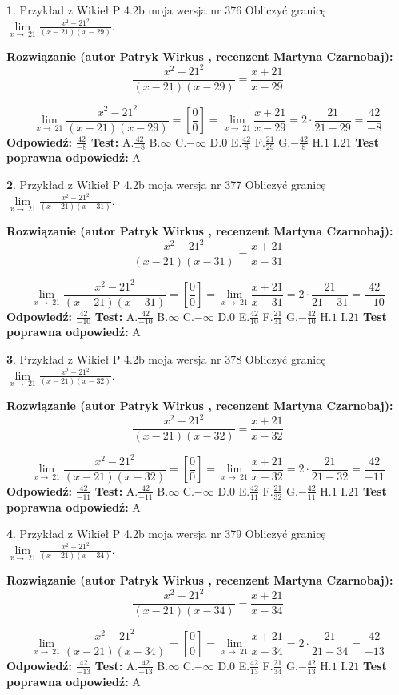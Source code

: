 \documentclass[12pt, a4paper]{article}
\theoremstyle{definition} %
\newtheorem{zad}{}
\newcommand{\zadStart}[1]{\begin{zad}#1\newline}
\newcommand{\zadStop}{\end{zad}}
\newcommand{\rozwStart}[2]{\noindent \textbf{Rozwiązanie (autor #1 , recenzent #2): }\newline}
\newcommand{\rozwStop}{\newline}
\newcommand{\odpStart}{\noindent \textbf{Odpowiedź:}\newline}
\newcommand{\odpStop}{\newline}
\newcommand{\testStart}{\noindent \textbf{Test:}\newline}
\newcommand{\testStop}{\newline}
\newcommand{\kluczStart}{\noindent \textbf{Test poprawna odpowiedź:}\newline}
\newcommand{\kluczStop}{\newline}
\begin{document}
\zadStart{Przykład z Wikieł P 4.2b moja wersja nr 376}
Obliczyć granicę $\lim\limits_{x\to\ 21}\frac{x^{2}-21^{2}}{(x-21)(x-29)}$.
\zadStop
\rozwStart{Patryk Wirkus}{Martyna Czarnobaj}
$$\frac{x^{2}-21^{2}}{(x-21)(x-29)}=\frac{x+21}{x-29}$$

$$\lim\limits_{x\to\ 21}\frac{x^{2}-21^{2}}{(x-21)(x-29)}=[\frac{0}{0}]=\lim\limits_{x\to\ 21}\frac{x+21}{x-29}=2 \cdot \frac{21}{21-29} = \frac{42}{-8}$$
\rozwStop
\odpStart
$\frac{42}{-8}$
\odpStop
\testStart
A.$\frac{42}{-8}$
B.$\infty$
C.$-\infty$
D.$0$
E.$\frac{42}{8}$
F.$\frac{21}{29}$
G.$-\frac{42}{8}$
H.$1$
I.$21$
\testStop
\kluczStart
A
\kluczStop



\zadStart{Przykład z Wikieł P 4.2b moja wersja nr 377}
Obliczyć granicę $\lim\limits_{x\to\ 21}\frac{x^{2}-21^{2}}{(x-21)(x-31)}$.
\zadStop
\rozwStart{Patryk Wirkus}{Martyna Czarnobaj}
$$\frac{x^{2}-21^{2}}{(x-21)(x-31)}=\frac{x+21}{x-31}$$

$$\lim\limits_{x\to\ 21}\frac{x^{2}-21^{2}}{(x-21)(x-31)}=[\frac{0}{0}]=\lim\limits_{x\to\ 21}\frac{x+21}{x-31}=2 \cdot \frac{21}{21-31} = \frac{42}{-10}$$
\rozwStop
\odpStart
$\frac{42}{-10}$
\odpStop
\testStart
A.$\frac{42}{-10}$
B.$\infty$
C.$-\infty$
D.$0$
E.$\frac{42}{10}$
F.$\frac{21}{31}$
G.$-\frac{42}{10}$
H.$1$
I.$21$
\testStop
\kluczStart
A
\kluczStop



\zadStart{Przykład z Wikieł P 4.2b moja wersja nr 378}
Obliczyć granicę $\lim\limits_{x\to\ 21}\frac{x^{2}-21^{2}}{(x-21)(x-32)}$.
\zadStop
\rozwStart{Patryk Wirkus}{Martyna Czarnobaj}
$$\frac{x^{2}-21^{2}}{(x-21)(x-32)}=\frac{x+21}{x-32}$$

$$\lim\limits_{x\to\ 21}\frac{x^{2}-21^{2}}{(x-21)(x-32)}=[\frac{0}{0}]=\lim\limits_{x\to\ 21}\frac{x+21}{x-32}=2 \cdot \frac{21}{21-32} = \frac{42}{-11}$$
\rozwStop
\odpStart
$\frac{42}{-11}$
\odpStop
\testStart
A.$\frac{42}{-11}$
B.$\infty$
C.$-\infty$
D.$0$
E.$\frac{42}{11}$
F.$\frac{21}{32}$
G.$-\frac{42}{11}$
H.$1$
I.$21$
\testStop
\kluczStart
A
\kluczStop



\zadStart{Przykład z Wikieł P 4.2b moja wersja nr 379}
Obliczyć granicę $\lim\limits_{x\to\ 21}\frac{x^{2}-21^{2}}{(x-21)(x-34)}$.
\zadStop
\rozwStart{Patryk Wirkus}{Martyna Czarnobaj}
$$\frac{x^{2}-21^{2}}{(x-21)(x-34)}=\frac{x+21}{x-34}$$

$$\lim\limits_{x\to\ 21}\frac{x^{2}-21^{2}}{(x-21)(x-34)}=[\frac{0}{0}]=\lim\limits_{x\to\ 21}\frac{x+21}{x-34}=2 \cdot \frac{21}{21-34} = \frac{42}{-13}$$
\rozwStop
\odpStart
$\frac{42}{-13}$
\odpStop
\testStart
A.$\frac{42}{-13}$
B.$\infty$
C.$-\infty$
D.$0$
E.$\frac{42}{13}$
F.$\frac{21}{34}$
G.$-\frac{42}{13}$
H.$1$
I.$21$
\testStop
\kluczStart
A
\kluczStop
\end{document}
